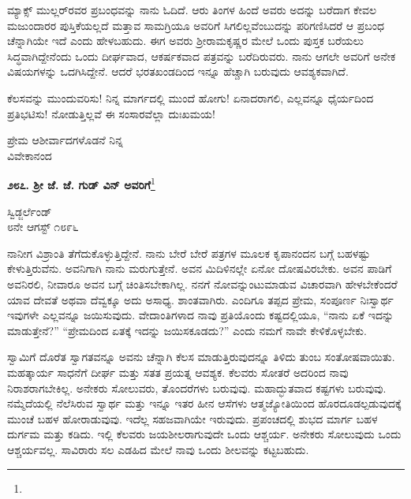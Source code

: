\vspace{0.1cm}

ಮ್ಯಾಕ್ಸ್ ಮುಲ್ಲರ್‌ರವರ ಪ್ರಬಂಧವನ್ನು ನಾನು ಓದಿದೆ. ಆರು ತಿಂಗಳ ಹಿಂದೆ ಅವರು ಅದನ್ನು ಬರೆದಾಗ ಕೇವಲ ಮಜುಂದಾರರ ಪುಸ್ತಿಕೆಯಲ್ಲದೆ ಮತ್ತಾವ ಸಾಮಗ್ರಿಯೂ ಅವರಿಗೆ ಸಿಗಲಿಲ್ಲವೆಂಬುದನ್ನು ಪರಿಗಣಿಸಿದರೆ ಆ ಪ್ರಬಂಧ ಚೆನ್ನಾಗಿಯೇ ಇದೆ ಎಂದು ಹೇಳಬಹುದು. ಈಗ ಅವರು ಶ‍್ರೀರಾಮಕೃಷ್ಣರ ಮೇಲೆ ಒಂದು ಪುಸ್ತಕ ಬರೆಯಲು ಸಿದ್ಧವಾಗಿದ್ದೇನೆಂದು ಒಂದು ದೀರ್ಘವಾದ, ಆಕರ್ಷಕವಾದ ಪತ್ರವನ್ನು ಬರೆದಿರುವರು. ನಾನು ಆಗಲೇ ಅವರಿಗೆ ಅನೇಕ ವಿಷಯಗಳನ್ನು ಒದಗಿಸಿದ್ದೇನೆ. ಆದರೆ ಭರತಖಂಡದಿಂದ ಇನ್ನೂ ಹೆಚ್ಚಾಗಿ ಬರುವುದು ಆವಶ್ಯಕವಾಗಿದೆ.

\vspace{0.1cm}

ಕೆಲಸವನ್ನು ಮುಂದುವರಿಸು! ನಿನ್ನ ಮಾರ್ಗದಲ್ಲಿ ಮುಂದೆ ಹೋಗು! ಏನಾದರಾಗಲಿ, ಎಲ್ಲವನ್ನೂ ಧೈರ್ಯದಿಂದ ಪ್ರತಿಭಟಿಸು! ನೋಡುತ್ತಿಲ್ಲವೆ ಈ ಸಂಸಾರವೆಲ್ಲಾ ದುಃಖಮಯ!
\vspace{-0.5cm}

{\flushright
ಪ್ರೇಮ ಆಶೀರ್ವಾದಗಳೊಡನೆ ನಿನ್ನ\\ವಿವೇಕಾನಂದ\par}

\begin{center}
\textbf{೨೮೭. ಶ‍್ರೀ ಜೆ. ಜೆ. ಗುಡ್ ವಿನ್ ಅವರಿಗೆ}\footnote{}
\end{center}

\begin{flushright}
ಸ್ವಿಡ್ಜರ್ಲೆಂಡ್\\೮ನೇ ಆಗಸ್ಟ್ ೧೮೯೬
\end{flushright}

ನಾನೀಗ ವಿಶ್ರಾಂತಿ ತೆಗೆದುಕೊಳ್ಳುತ್ತಿದ್ದೇನೆ. ನಾನು ಬೇರೆ ಬೇರೆ ಪತ್ರಗಳ ಮೂಲಕ ಕೃಪಾನಂದನ ಬಗ್ಗೆ ಬಹಳಷ್ಟು ಕೇಳುತ್ತಿರುವೆನು. ಅವನಿಗಾಗಿ ನಾನು ಮರುಗುತ್ತೇನೆ. ಅವನ ಮಿದಿಳಿನಲ್ಲೇ ಏನೋ ದೋಷವಿರಬೇಕು. ಅವನ ಪಾಡಿಗೆ ಅವನಿರಲಿ, ನೀವಾರೂ ಅವನ ಬಗ್ಗೆ ಚಿಂತಿಸಬೇಕಾಗಿಲ್ಲ. ನನಗೆ ನೋವನ್ನುಂಟುಮಾಡುವ ವಿಚಾರವಾಗಿ ಹೇಳಬೇಕೆಂದರೆ ಯಾವ ದೇವತೆ ಅಥವಾ ದೆವ್ವಕ್ಕೂ ಅದು ಅಸಾಧ್ಯ. ಶಾಂತವಾಗಿರು. ಎಂದಿಗೂ ತಪ್ಪದ ಪ್ರೇಮ, ಸಂಪೂರ್ಣ ನಿಃಸ್ವಾರ್ಥ ಇವುಗಳೇ ಎಲ್ಲವನ್ನೂ ಜಯಿಸುವುದು. ವೇದಾಂತಿಗಳಾದ ನಾವು ಪ್ರತಿಯೊಂದು ಕಷ್ಟದಲ್ಲಿಯೂ, “ನಾನು ಏಕೆ ಇದನ್ನು ಮಾಡುತ್ತೇನೆ?” “ಪ್ರೇಮದಿಂದ ಏತಕ್ಕೆ ಇದನ್ನು ಜಯಿಸಕೂಡದು?” ಎಂದು ನಮಗೆ ನಾವೇ ಕೇಳಿಕೊಳ್ಳಬೇಕು.

ಸ್ವಾಮಿಗೆ ದೊರೆತ ಸ್ವಾಗತವನ್ನೂ ಅವನು ಚೆನ್ನಾಗಿ ಕೆಲಸ ಮಾಡುತ್ತಿರುವುದನ್ನೂ ತಿಳಿದು ತುಂಬ ಸಂತೋಷವಾಯಿತು. ಮಹತ್ಕಾರ್ಯ ಸಾಧನೆಗೆ ದೀರ್ಘ ಮತ್ತು ಸತತ ಪ್ರಯತ್ನ ಆವಶ್ಯಕ. ಕೆಲವರು ಸೋತರೆ ಅದರಿಂದ ನಾವು ನಿರಾಶರಾಗಬೇಕಿಲ್ಲ. ಅನೇಕರು ಸೋಲುವರು, ತೊಂದರೆಗಳು ಬರುವುವು. ಮಹಾದ್ಭುತವಾದ ಕಷ್ಟಗಳು ಬರುವುವು. ನಮ್ಮೆದೆಯಲ್ಲಿ ನೆಲೆಸಿರುವ ಸ್ವಾರ್ಥ ಮತ್ತು ಇನ್ನೂ ಇತರ ಹೀನ ಆಸೆಗಳು ಆತ್ಮಜ್ಯೋತಿಯಿಂದ ಹೊರದೂಡಲ್ಪಡುವುದಕ್ಕೆ ಮುಂಚೆ ಬಹಳ ಹೋರಾಡುವುವು. ಇದೆಲ್ಲ ಸಹಜವಾಗಿಯೇ ಇರುವುದು. ಪ್ರಪಂಚದಲ್ಲಿ ಶುಭದ ಮಾರ್ಗ ಬಹಳ ದುರ್ಗಮ ಮತ್ತು ಕಡಿದು. ಇಲ್ಲಿ ಕೆಲವರು ಜಯಶೀಲರಾಗುವುದೇ ಒಂದು ಆಶ್ಚರ್ಯ. ಅನೇಕರು ಸೋಲುವುದು ಒಂದು ಆಶ್ಚರ್ಯವಲ್ಲ. ಸಾವಿರಾರು ಸಲ ಎಡಹಿದ ಮೇಲೆ ನಾವು ಒಂದು ಶೀಲವನ್ನು ಕಟ್ಟಬಹುದು.

